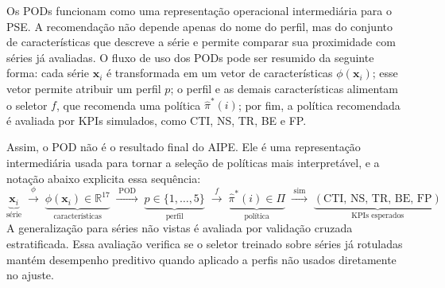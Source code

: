 Os PODs funcionam como uma representação operacional intermediária para o PSE. A recomendação não depende apenas do nome do perfil, mas do conjunto de características que descreve a série e permite comparar sua proximidade com séries já avaliadas. O fluxo de uso dos PODs pode ser resumido da seguinte forma: cada série $\mathbf{x}_i$ é transformada em um vetor de características $\phi(\mathbf{x}_i)$; esse vetor permite atribuir um perfil $p$; o perfil e as demais características alimentam o seletor $f$, que recomenda uma política $\hat{\pi}^*(i)$; por fim, a política recomendada é avaliada por KPIs simulados, como CTI, NS, TR, BE e FP.

Assim, o POD não é o resultado final do AIPE. Ele é uma representação intermediária usada para tornar a seleção de políticas mais interpretável, e a notação abaixo explicita essa sequência:
\[
  \underbrace{\mathbf{x}_i}_{\text{série}} \;\xrightarrow{\;\phi\;}\; \underbrace{\phi(\mathbf{x}_i) \in \mathbb{R}^{17}}_{\text{características}} \;\xrightarrow{\;\mathrm{POD}\;}\; \underbrace{p \in \{1,\ldots,5\}}_{\text{perfil}} \;\xrightarrow{\;f\;}\; \underbrace{\hat{\pi}^*(i) \in \Pi}_{\text{política}} \;\xrightarrow{\;\mathrm{sim}\;}\; \underbrace{(\mathrm{CTI},\,\mathrm{NS},\,\mathrm{TR},\,\mathrm{BE},\,\mathrm{FP})}_{\text{KPIs esperados}}
\]
A generalização para séries não vistas é avaliada por validação cruzada estratificada. Essa avaliação verifica se o seletor treinado sobre séries já rotuladas mantém desempenho preditivo quando aplicado a perfis não usados diretamente no ajuste.

